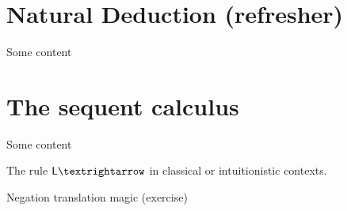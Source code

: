 %
\chapter{Natural Deduction (refresher)}
%
Some content
%
\chapter{The sequent calculus}
%
Some content

\begin{convention}
	The rule \( \impL \) in classical or intuitionistic contexts.
\end{convention}

\bigskip
Negation translation magic (exercise)